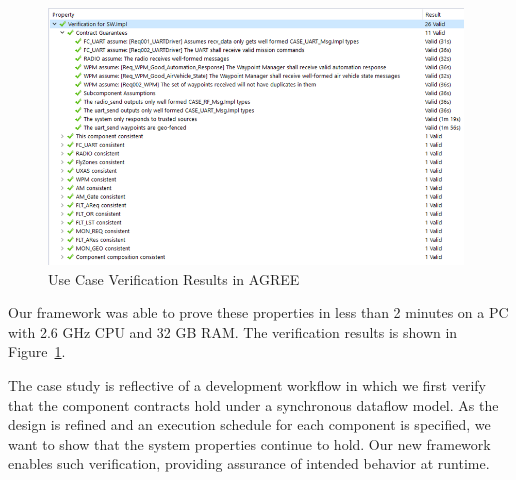 \begin{figure}[t!]
\centering
\includegraphics[width=110mm]{proof.png}
\caption{Use Case Verification Results in AGREE \label{proof}}
\end{figure}

Our framework was able to prove these properties in less than 2 minutes on a PC with 2.6 GHz CPU and 32 GB RAM. The verification results is shown in Figure~\ref{proof}. 

The case study is reflective of a development workflow in which we first verify that the component contracts hold under a synchronous dataflow model.  As the design is refined and an execution schedule for each component is specified, we want to show that the system properties continue to hold.  Our new framework enables such verification, providing assurance of intended behavior at runtime. 